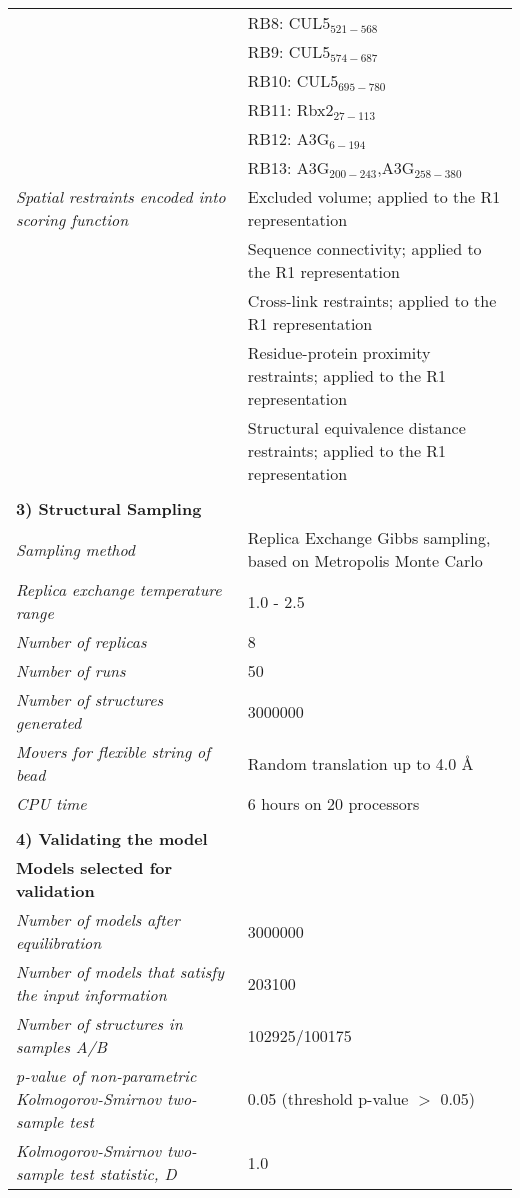 \documentclass[8pt,a4paper]{article}
\begin{document}
\begin{longtable}{ p{} | p{} }
            & RB8: CUL5$_{521-568}$ \\
            & RB9: CUL5$_{574-687}$ \\
            & RB10: CUL5$_{695-780}$ \\
            & RB11: Rbx2$_{27-113}$ \\
            & RB12: A3G$_{6-194}$ \\
            & RB13: A3G$_{200-243}$,A3G$_{258-380}$ \\
                \textit{Spatial restraints encoded into scoring function} & Excluded volume; applied to the R1 representation\\
            & Sequence connectivity; applied to the R1 representation \\
            & Cross-link restraints; applied to the R1 representation \\
            & Residue-protein proximity restraints; applied to the R1 representation \\
            & Structural equivalence distance restraints; applied to the R1 representation \\
        

   &  \\
    \normalsize{\textbf{3) Structural Sampling}} & \\
    \hline
            \textit{Sampling method} & Replica Exchange Gibbs sampling, based on Metropolis Monte Carlo\\
                \textit{Replica exchange temperature range} & 1.0 - 2.5\\
                \textit{Number of replicas} & 8\\
                \textit{Number of runs} & 50\\
                \textit{Number of structures generated} & 3000000\\
                \textit{Movers for flexible string of bead} & Random translation up to 4.0 \AA\\
                \textit{CPU time} & 6 hours on 20 processors\\
        
   &  \\
  \normalsize{\textbf{4) Validating the model}} & \\
    \hline
   \textbf{Models selected for validation} & \\
    \hline
          \textit{Number of models after equilibration} & 3000000\\
                \textit{Number of models that satisfy the input information} & 203100\\
                \textit{Number of structures in samples A/B} & 102925/100175\\
                \textit{p-value of non-parametric Kolmogorov-Smirnov two-sample test} & 0.05 (threshold p-value $>$ 0.05)\\
                \textit{Kolmogorov-Smirnov two-sample test statistic, D} & 1.0\\
           \hline
    

\end{longtable}
\end{document}
